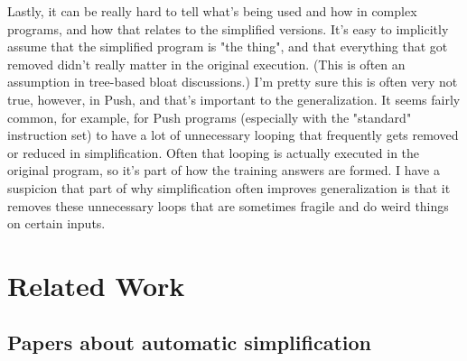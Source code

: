 Lastly, it can be really hard to tell what's being used and how in complex programs, and how that relates to the simplified versions. It's easy to implicitly assume that the simplified program is "the thing", and that everything that got removed didn't really matter in the original execution. (This is often an assumption in tree-based bloat discussions.) I'm pretty sure this is often very not true, however, in Push, and that's important to the generalization. It seems fairly common, for example, for Push programs (especially with the "standard" instruction set) to have a lot of unnecessary looping that frequently gets removed or reduced in simplification. Often that looping is actually executed in the original program, so it's part of how the training answers are formed. I have a suspicion that part of why simplification often improves generalization is that it removes these unnecessary loops that are sometimes fragile and do weird things on certain inputs.



\section{Related Work}
\label{sec:related}



\subsection{Papers about automatic simplification}

